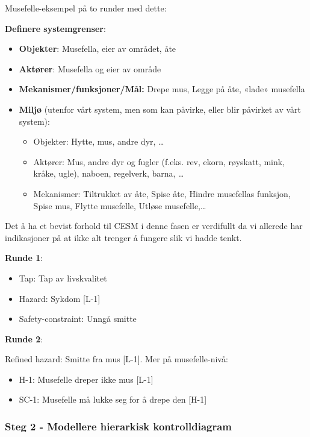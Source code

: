 Musefelle-eksempel på to runder med dette:

\textbf{Definere systemgrenser}:

\begin{itemize}
    \item \textbf{Objekter}: Musefella, eier av området, åte
    \item \textbf{Aktører}: Musefella og eier av område
    \item \textbf{Mekanismer/funksjoner/Mål:} Drepe mus, Legge på åte, «lade» musefella
    \item \textbf{Miljø} (utenfor vårt system, men som kan påvirke, eller blir påvirket av vårt system):
    \begin{itemize}
        \item Objekter: Hytte, mus, andre dyr, …
        \item Aktører: Mus, andre dyr og fugler (f.eks. rev, ekorn, røyskatt, mink, kråke, ugle), naboen, regelverk, barna, …
        \item Mekanismer: Tiltrukket av åte, Spise åte, Hindre musefellas funksjon, Spise mus, Flytte musefelle, Utløse musefelle,…
    \end{itemize}

\end{itemize}

 Det å ha et bevist forhold til CESM i denne fasen er verdifullt da vi
allerede har indikasjoner på at ikke alt trenger å fungere slik vi hadde tenkt.

\textbf{Runde 1}:

\begin{itemize}
    \item Tap: Tap av livskvalitet 
    \item Hazard: Sykdom [L-1]
    \item Safety-constraint: Unngå smitte
\end{itemize}

\textbf{Runde 2}:

Refined hazard: Smitte fra mus [L-1]. Mer på musefelle-nivå:
\begin{itemize}
    
    \item H-1: Musefelle dreper ikke mus [L-1]
    \item SC-1: Musefelle må lukke seg for å drepe den [H-1]

\end{itemize}

\subsubsection{Steg 2 - Modellere hierarkisk kontrolldiagram}

